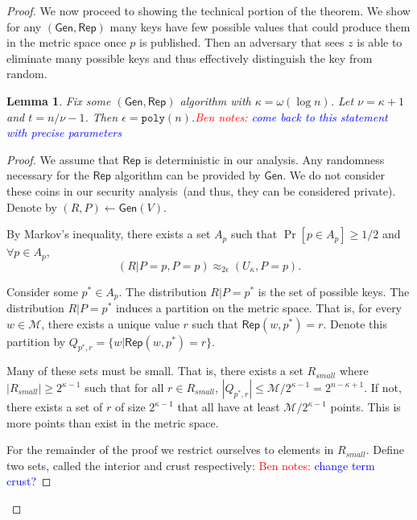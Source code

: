 \documentclass[11pt]{article}
\newcommand{\class}[1]{{\ensuremath{\mathsf{#1}}}}
\newcommand{\gen}{\ensuremath{\class{Gen}}\xspace}
\newcommand{\rep}{\ensuremath{\class{Rep}}\xspace}
\newcommand{\sketch}{\ensuremath{\class{SS}}\xspace}
\newcommand{\rec}{\ensuremath{\class{Rec}}\xspace}
\newcommand{\dis}{\ensuremath{\mathsf{dis}}}
\newcommand{\poly}{\ensuremath{\mathtt{poly}}\xspace}
\newtheorem{lemma}[theorem]{Lemma}
\newcommand{\authnote}[2]{{\textcolor{red}{\textsf{#1 notes: }\textcolor{blue}{ #2}}\marginpar{\textcolor{red}{\textbf{!!!!!}}}}}
\newcommand{\authnote}[2]{}
\newcommand{\bnote}[1]{{\authnote{Ben}{#1}}}
\begin{document}
\begin{proof}
We now proceed to showing the technical portion of the theorem.  We show for any $(\gen, \rep)$ many keys have few possible values that could produce them in the metric space once $p$ is published.  Then an adversary that sees $z$ is able to eliminate many possible keys and thus effectively distinguish the key from random.

\begin{lemma}
Fix some $(\gen, \rep)$ algorithm with $\kappa = \omega(\log n)$.  Let $\nu = \kappa+1$ and $t = n/\nu-1$.  Then $\epsilon = \poly(n)$.\bnote{come back to this statement with precise parameters}
\end{lemma}
\begin{proof}
We assume that $\rep$ is deterministic in our analysis.  Any randomness necessary for the \rep algorithm can be provided by $\gen$.  We do not consider these coins in our security analysis~(and thus, they can be considered private).  Denote by $(R, P) \leftarrow \gen(V)$.

By Markov's inequality, there exists a set $A_{p}$ such that $\Pr[p\in A_{p}]\ge 1/2$ and $\forall p\in A_{p}$, 
\[
(R |P =p, P = p ) \approx_{2\epsilon} (U_\kappa , P =p).
\]

Consider some $p^*\in A_{p}$.  %
The distribution $R|P=p^*$ is the set of possible keys.
The distribution $R|P=p^*$ induces a partition on the metric space.  That is, for every $w\in\mathcal{M}$, there exists a unique value $r$ such that $\rep(w, p^*) =r$.  Denote this partition by $Q_{p^*,r} = \{w | \rep(w, p^*) = r\}$.  

Many of these sets must be small.  That is, there exists a set $R_{small}$  where $|R_{small} | \ge 2^{\kappa-1}$ such that for all $r\in R_{small}$,  $|Q_{p^*, r}|\le \mathcal{M}/2^{\kappa-1} = 2^{n-\kappa +1}$.  If not, there exists a set of $r$ of size $2^{\kappa-1}$ that all have at least $\mathcal{M}/2^{\kappa-1}$ points.  This is more points than exist in the metric space.  

For the remainder of the proof we restrict ourselves to elements in $R_{small}$.  Define two sets, called the interior and crust respectively: \bnote{change term crust?}


\end{proof}
\end{proof}
\end{document}
